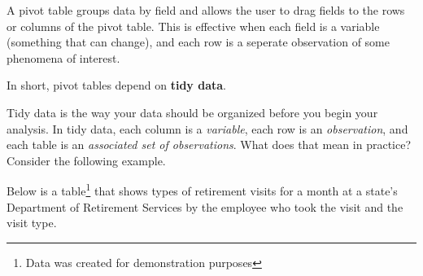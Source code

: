 \documentclass[]{book}
\newenvironment{Shaded}{\begin{snugshade}}{\end{snugshade}}
\newcommand{\CommentTok}[1]{\textcolor[rgb]{0.56,0.35,0.01}{\textit{#1}}}
\newcommand{\DataTypeTok}[1]{\textcolor[rgb]{0.13,0.29,0.53}{#1}}
\newcommand{\DecValTok}[1]{\textcolor[rgb]{0.00,0.00,0.81}{#1}}
\newcommand{\KeywordTok}[1]{\textcolor[rgb]{0.13,0.29,0.53}{\textbf{#1}}}
\newcommand{\NormalTok}[1]{#1}
\newcommand{\OperatorTok}[1]{\textcolor[rgb]{0.81,0.36,0.00}{\textbf{#1}}}
\newcommand{\OtherTok}[1]{\textcolor[rgb]{0.56,0.35,0.01}{#1}}
\newcommand{\StringTok}[1]{\textcolor[rgb]{0.31,0.60,0.02}{#1}}
\begin{document}
A pivot table groups data by field and allows the user to drag fields to the rows or columns of the pivot table. This is effective when each field is a variable (something that can change), and each row is a seperate observation of some phenomena of interest.

In short, pivot tables depend on \textbf{tidy data}.

Tidy data is the way your data should be organized before you begin your analysis. In tidy data, each column is a \emph{variable}, each row is an \emph{observation}, and each table is an \emph{associated set of observations}. What does that mean in practice? Consider the following example.

Below is a table\footnote{Data was created for demonstration purposes} that shows types of retirement visits for a month at a state's Department of Retirement Services by the employee who took the visit and the visit type.

\begin{Shaded}
\end{Shaded}
\end{document}
